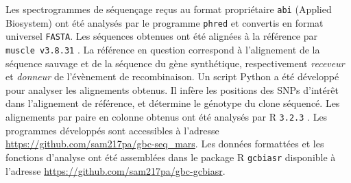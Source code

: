 Les spectrogrammes de séquençage reçus au format propriétaire \texttt{abi}
(Applied Biosystem) ont été analysés par le programme \texttt{phred}
\cite{ewing_base-calling_1998} et convertis en format universel \texttt{FASTA}.
Les séquences obtenues ont été alignées à la référence par \texttt{ muscle
	v3.8.31} \cite{edgar_muscle:_2004}. La référence en question correspond
à l'alignement de la séquence sauvage et de la séquence du gène synthétique,
respectivement \emph{receveur} et \emph{donneur} de l'évènement de
recombinaison. Un script Python \cite{cock_biopython:_2009} a été développé
pour analyser les alignements obtenus. Il infère les positions des SNPs
d'intérêt dans l'alignement de référence, et détermine le génotype du clone
séquencé. Les alignements par paire en colonne obtenus ont été analysés par
\textrm{R} \texttt{3.2.3} \cite{r_core_team_r:_2015}. Les programmes développés
sont accessibles à l'adresse \url{https://github.com/sam217pa/gbc-seq_mars}.
Les données formattées et les fonctions d'analyse ont été assemblées dans le
package \textrm{R} \texttt{gcbiasr} disponible à l'adresse
\url{https://github.com/sam217pa/gbc-gcbiasr}.
